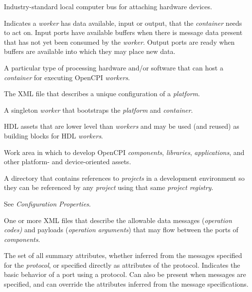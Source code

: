 \documentclass[10pt, a4paper, oneside]{article}
\renewcommand\_{\textunderscore\allowbreak} %
\begin{document}
\begin{description}[style=nextline]
\item[PCI (Peripheral Component Interconnect)]
Industry-standard local computer bus for attaching hardware devices.

\item[Port Readiness]
Indicates a \textit{worker} has data available, input or output, that the \textit{container} needs to act on. Input ports have available buffers when there is message data present that has not yet been consumed by the \textit{worker}. Output ports are ready when buffers are available into which they may place new data.

\item[Platform]
A particular type of processing hardware and/or software that can host a \textit{container} for executing OpenCPI \textit{workers}.

\item[Platform Configuration]
The XML file that describes a unique configuration of a \textit{platform}.

\item[Platform Worker]
A singleton \textit{worker} that bootstraps the \textit{platform} and \textit{container}.

\item[Primitive]
HDL assets that are lower level than \textit{workers} and may be used (and reused) as building blocks for HDL \textit{workers}.

\item[Project]
Work area in which to develop OpenCPI \textit{components}, \textit{libraries}, \textit{applications}, and other platform- and device-oriented assets.

\item[Project Registry]
A directory that contains references to \textit{projects} in a development environment so they can be referenced by any \textit{project} using that same \textit{project registry}.

\item[Property]
See \textit{Configuration Properties}.

\item[Protocol Specification (OPS)]
One or more XML files that describe the allowable data messages (\textit{operation codes)} and payloads (\textit{operation arguments}) that may flow between the ports of \textit{components}.

\item[Protocol Summary]
The set of all summary attributes, whether inferred from the messages specified for the \textit{protocol}, or specified directly as attributes of the protocol. Indicates the basic behavior of a port using a protocol.  Can also be present when messages are specified, and can override the attributes inferred from the message specifications.


\end{description}
\end{document}
